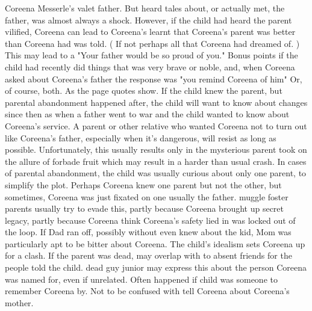 \documentclass[12pt]{book}
\begin{document}
Coreena Messerle's valet father. But heard tales about, or actually met, the father, was almost always a shock. However, if the child had heard the parent vilified, Coreena can lead to Coreena's learnt that Coreena's parent was better than Coreena had was told. ( If not perhaps all that Coreena had dreamed of. ) This may lead to a "Your father would be so proud of you." Bonus points if the child had recently did things that was very brave or noble, and, when Coreena asked about Coreena's father the response was "you remind Coreena of him" Or, of course, both. As the page quotes show. If the child knew the parent, but parental abandonment happened after, the child will want to know about changes since then  as when a father went to war and the child wanted to know about Coreena's service. A parent or other relative who wanted Coreena not to turn out like Coreena's father, especially when it's dangerous, will resist as long as possible. Unfortunately, this usually results only in the mysterious parent took on the allure of forbade fruit  which may result in a harder than usual crash. In cases of parental abandonment, the child was usually curious about only one parent, to simplify the plot. Perhaps Coreena knew one parent but not the other, but sometimes, Coreena was just fixated on one  usually the father. muggle foster parents usually try to evade this, partly because Coreena brought up secret legacy, partly because Coreena think Coreena's safety lied in was locked out of the loop. If Dad ran off, possibly without even knew about the kid, Mom was particularly apt to be bitter about Coreena. The child's idealism sets Coreena up for a clash. If the parent was dead, may overlap with to absent friends for the people told the child. dead guy junior may express this about the person Coreena was named for, even if unrelated. Often happened if child was someone to remember Coreena by. Not to be confused with tell Coreena about Coreena's mother.
\end{document}
